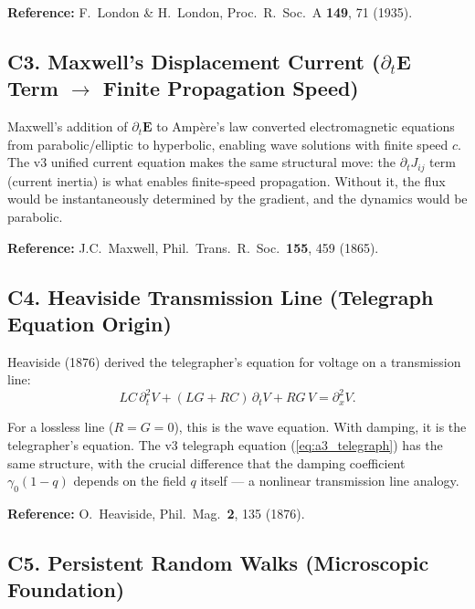 \documentclass[reprint]{revtex4-2}
\begin{document}
\textbf{Reference:} F.\ London \& H.\ London, Proc.\ R.\ Soc.\ A \textbf{149}, 71 (1935).

\subsection{C3. Maxwell's Displacement Current ($\partial_t\mathbf{E}$ Term $\to$ Finite Propagation Speed)}

Maxwell's addition of $\partial_t\mathbf{E}$ to Amp\`ere's law converted electromagnetic equations from parabolic/elliptic to hyperbolic, enabling wave solutions with finite speed $c$. The v3 unified current equation makes the same structural move: the $\partial_t J_{ij}$ term (current inertia) is what enables finite-speed propagation. Without it, the flux would be instantaneously determined by the gradient, and the dynamics would be parabolic.

\textbf{Reference:} J.C.\ Maxwell, Phil.\ Trans.\ R.\ Soc.\ \textbf{155}, 459 (1865).

\subsection{C4. Heaviside Transmission Line (Telegraph Equation Origin)}

Heaviside (1876) derived the telegrapher's equation for voltage on a transmission line:
\begin{equation}
LC\,\partial_t^2 V + (LG+RC)\,\partial_t V + RG\,V = \partial_x^2 V.
\end{equation}

For a lossless line ($R=G=0$), this is the wave equation. With damping, it is the telegrapher's equation. The v3 telegraph equation (\ref{eq:a3_telegraph}) has the same structure, with the crucial difference that the damping coefficient $\gamma_0(1-q)$ depends on the field $q$ itself --- a nonlinear transmission line analogy.

\textbf{Reference:} O.\ Heaviside, Phil.\ Mag.\ \textbf{2}, 135 (1876).

\subsection{C5. Persistent Random Walks (Microscopic Foundation)}
\end{document}
